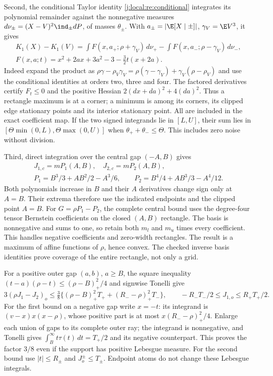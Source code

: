 Second, the conditional Taylor identity
\eqref{j:local:re:conditional} integrates its polynomial remainder
against the nonnegative measures
$d\nu_\pm=(X-V)^2\ind_\pm dP$, of masses $\theta_\pm$.
With $a_\pm=|\E[X\mid\pm]|$, $\gamma_V=\E V^3$, it gives
\begin{equation}\label{j:local:entry201:Kexact}\begin{gathered}
 K_1(X)-K_1(V)=
 \int F(x,a_+;\rho+\gamma_V)\,d\nu_+
 -\int F(x,a_-;\rho-\gamma_V)\,d\nu_-,\\
 F(x,a;t)=x^2+2ax+3a^2-3-\tfrac32t(x+2a).
\end{gathered}\end{equation}
Indeed expand the product as
$\rho\gamma-\rho_V\gamma_V=\rho(\gamma-\gamma_V)
+\gamma_V(\rho-\rho_V)$ and use the conditional identities at orders
two, three and four. The factored derivatives certify $F_t\le0$ and
the positive Hessian $2(dx+da)^2+4(da)^2$.
Thus a rectangle maximum is at a corner; a minimum is among its corners,
its clipped edge stationary points and its interior stationary point.
All are included in the exact coefficient map. If the two signed
integrands lie in $[L,U]$, their sum lies in
$[\Theta\min(0,L),\Theta\max(0,U)]$ when
$\theta_++\theta_-\le\Theta$. This includes zero noise without division.

Third, direct integration over the central gap $(-A,B)$ gives
\begin{gather*}
 J_{1,c}=mP_1(A,B),\quad J_{2,c}=mP_2(A,B),\\
 P_1=B^3/3+AB^2/2-A^3/6,\qquad
 P_2=B^4/4+AB^3/3-A^4/12.
\end{gather*}
Both polynomials increase in $B$ and their $A$ derivatives change sign
only at $A=B$. Their extrema therefore use the indicated endpoints and
the clipped point $A=B$. For $G=\rho P_1-P_2$, the complete central
bound uses the degree-four tensor Bernstein coefficients on the closed
$(A,B)$ rectangle. The basis is nonnegative and sums to one, so retain
both $m_l$ and $m_u$ times every coefficient. This handles negative
coefficients and zero-width rectangles. The result is a maximum of
affine functions of $\rho$, hence convex. The checked inverse basis
identities prove coverage of the entire rectangle, not only a grid.

For a positive outer gap $(a,b)$, $a\ge B$, the square inequality
$(t-a)(\rho-t)\le(\rho-B)_+^2/4$ and signwise Tonelli give
\[
 3(\rho J_1-J_2)_o\le\tfrac38
 \{(\rho-B)_+^2T_++(R_--\rho)_+^2T_-\},\qquad
 -R_-T_-/2\le J_{1,o}\le R_+T_+/2.
\]
For the first bound on a negative gap write $x=-t$: its integrand is
$(v-x)x(x-\rho)$, whose positive part is at most
$x(R_--\rho)_+^2/4$. Enlarge each union of gaps to its complete
outer ray; the integrand is nonnegative, and Tonelli gives
$\int_B^\infty t\tau(t)\,dt=T_+/2$ and its negative counterpart.
This proves the factor $3/8$ even if the support has positive Lebesgue
measure. For the second bound use
$|t|\le R_\pm$ and $J_o^\pm\le T_\pm$.
Endpoint atoms do not change these Lebesgue integrals.


